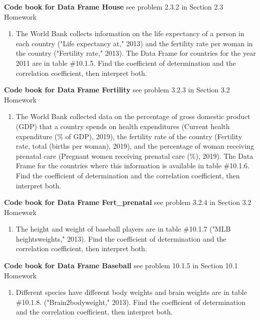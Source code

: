 \documentclass[
]{book}
\providecommand{\tightlist}{%
  \setlength{\itemsep}{0pt}\setlength{\parskip}{0pt}}
\begin{document}
\textbf{Code book for Data Frame House} see problem 2.3.2 in Section 2.3 Homework

\begin{enumerate}
\def\labelenumi{\arabic{enumi}.}
\setcounter{enumi}{2}
\tightlist
\item
  The World Bank collects information on the life expectancy of a person in each country ("Life expectancy at," 2013) and the fertility rate per woman in the country ("Fertility rate," 2013). The Data Frame for countries for the year 2011 are in table \#10.1.5. Find the coefficient of determination and the correlation coefficient, then interpret both.
\end{enumerate}

\textbf{Code book for Data Frame Fertility} see problem 3.2.3 in Section 3.2 Homework

\begin{enumerate}
\def\labelenumi{\arabic{enumi}.}
\setcounter{enumi}{3}
\tightlist
\item
  The World Bank collected data on the percentage of gross domestic product (GDP) that a country spends on health expenditures (Current health expenditure (\% of GDP), 2019), the fertility rate of the country (Fertility rate, total (births per woman), 2019), and the percentage of woman receiving prenatal care (Pregnant women receiving prenatal care (\%), 2019). The Data Frame for the countries where this information is available in table \#10.1.6. Find the coefficient of determination and the correlation coefficient, then interpret both.
\end{enumerate}

\textbf{Code book for Data Frame Fert\_prenatal} see problem 3.2.4 in Section 3.2 Homework

\begin{enumerate}
\def\labelenumi{\arabic{enumi}.}
\setcounter{enumi}{4}
\tightlist
\item
  The height and weight of baseball players are in table \#10.1.7 ("MLB heightsweights," 2013). Find the coefficient of determination and the correlation coefficient, then interpret both.
\end{enumerate}

\textbf{Code book for Data Frame Baseball} see problem 10.1.5 in Section 10.1 Homework

\begin{enumerate}
\def\labelenumi{\arabic{enumi}.}
\setcounter{enumi}{5}
\tightlist
\item
  Different species have different body weights and brain weights are in table \#10.1.8. ("Brain2bodyweight," 2013). Find the coefficient of determination and the correlation coefficient, then interpret both.
\end{enumerate}
\end{document}
